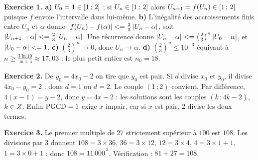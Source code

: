 \begin{corrige}
\textbf{Exercice 1. a)} $U_{0} = 1 \in \left[1\,;\,2\right]$ ; si $U_{n} \in
\left[1\,;\,2\right]$ alors $U_{n+1} = f(U_{n}) \in \left[1\,;\,2\right]$ puisque
$f$ envoie l'intervalle dans lui-même.
\textbf{b)} L'inégalité des accroissements finis entre $U_{n}$ et $\alpha$
donne $\left|f(U_{n})-f(\alpha)\right| <= \frac23\left|U_{n}-\alpha\right|$, soit
$\left|U_{n+1}-\alpha\right| <= \frac23\left|U_{n}-\alpha\right|$. Une récurrence donne
$\left|U_{n}-\alpha\right| <= \left(\frac23\right)^{n}\left|U_{0}-\alpha\right|$, et
$\left|U_{0}-\alpha\right| <= 1$.
\textbf{c)} $\left(\frac23\right)^{n} \to 0$, donc $U_{n} \to \alpha$.
\textbf{d)} $\left(\frac23\right)^{n} \leq 10^{-3}$ équivaut à
$n \geq \frac{3\ln10}{\ln1{,}5} \approx 17{,}03$ : le plus petit entier est
$n_{0} = 18$.

\textbf{Exercice 2.} De $y_{0} = 4x_{0}-2$ on tire que $y_{0}$ est pair. Si $d$ divise
$x_{0}$ et $y_{0}$, il divise $4x_{0}-y_{0} = 2$ : donc $d = 1$ ou $d = 2$.
Le couple $(1\,;2)$ convient. Par différence, $4(x-1) = y-2$, donc
$y = 4x-2$ : les solutions sont les couples $(k\,;4k-2)$, $k \in Z$. Enfin
$\operatorname{PGCD} = 1$ exige $x$ impair, car si $x$ est pair, $2$ divise les deux termes.

\textbf{Exercice 3.} Le premier multiple de $27$ strictement supérieur à $100$ est
$108$. Les divisions par $3$ donnent $108 = 3\times36$, $36 = 3\times12$,
$12 = 3\times4$, $4 = 3\times1+1$, $1 = 3\times0+1$ : donc
$108 = \overline{11\,000}^{\,3}$. Vérification : $81+27 = 108$.

\end{corrige}
